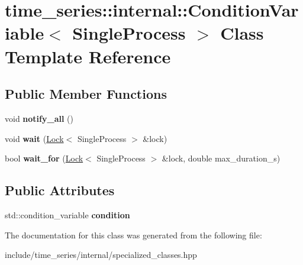 \hypertarget{classtime__series_1_1internal_1_1ConditionVariable_3_01SingleProcess_01_4}{}\section{time\+\_\+series\+:\+:internal\+:\+:Condition\+Variable$<$ Single\+Process $>$ Class Template Reference}
\label{classtime__series_1_1internal_1_1ConditionVariable_3_01SingleProcess_01_4}
\subsection*{Public Member Functions}
\begin{DoxyCompactItemize}
\item 
void {\bfseries notify\+\_\+all} ()\hypertarget{classtime__series_1_1internal_1_1ConditionVariable_3_01SingleProcess_01_4_a867255ac9bea0a76ad142e5cf9a3a882}{}\label{classtime__series_1_1internal_1_1ConditionVariable_3_01SingleProcess_01_4_a867255ac9bea0a76ad142e5cf9a3a882}

\item 
void {\bfseries wait} (\hyperlink{classtime__series_1_1internal_1_1Lock}{Lock}$<$ Single\+Process $>$ \&lock)\hypertarget{classtime__series_1_1internal_1_1ConditionVariable_3_01SingleProcess_01_4_a3eb5fc902d9f663da83a904a4f87c1bb}{}\label{classtime__series_1_1internal_1_1ConditionVariable_3_01SingleProcess_01_4_a3eb5fc902d9f663da83a904a4f87c1bb}

\item 
bool {\bfseries wait\+\_\+for} (\hyperlink{classtime__series_1_1internal_1_1Lock}{Lock}$<$ Single\+Process $>$ \&lock, double max\+\_\+duration\+\_\+s)\hypertarget{classtime__series_1_1internal_1_1ConditionVariable_3_01SingleProcess_01_4_a7a059a332c5ec04291aecdaac4a95292}{}\label{classtime__series_1_1internal_1_1ConditionVariable_3_01SingleProcess_01_4_a7a059a332c5ec04291aecdaac4a95292}

\end{DoxyCompactItemize}
\subsection*{Public Attributes}
\begin{DoxyCompactItemize}
\item 
std\+::condition\+\_\+variable {\bfseries condition}\hypertarget{classtime__series_1_1internal_1_1ConditionVariable_3_01SingleProcess_01_4_a32e166e9ba3db5d95730b87211748ecf}{}\label{classtime__series_1_1internal_1_1ConditionVariable_3_01SingleProcess_01_4_a32e166e9ba3db5d95730b87211748ecf}

\end{DoxyCompactItemize}


The documentation for this class was generated from the following file\+:\begin{DoxyCompactItemize}
\item 
include/time\+\_\+series/internal/specialized\+\_\+classes.\+hpp\end{DoxyCompactItemize}
